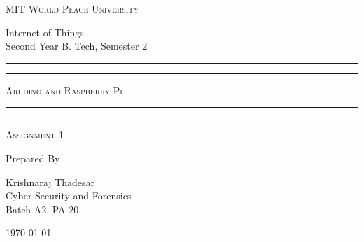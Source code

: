 \documentclass[11pt]{article}
\begin{document}
\begin{titlepage}
	\centering


	\huge\textsc{
		MIT World Peace University
	}\\

	\vspace{0.75\baselineskip} %

	\LARGE{
		Internet of Things\\
		Second Year B. Tech, Semester 2
	}

	\vfill %


	\rule{\textwidth}{1.6pt}\vspace*{-\baselineskip}\vspace*{2pt}
	\rule{\textwidth}{0.6pt}
	\vspace{0.75\baselineskip} %



	\huge{\textsc{
			Arudino and Raspberry Pi
		}} \\



	\vspace{0.5\baselineskip} %
	\rule{\textwidth}{0.6pt}\vspace*{-\baselineskip}\vspace*{2.8pt}
	\rule{\textwidth}{1.6pt}

	\vspace{1\baselineskip} %


	\LARGE\textsc{
		Assignment 1
	} %
	\vfill


	Prepared By
	\vspace{0.5\baselineskip} %

	\Large{
		Krishnaraj Thadesar \\
		Cyber Security and Forensics\\
		Batch A2, PA 20
	}


	\vspace{0.5\baselineskip} %
	\today

\end{titlepage}
\end{document}
